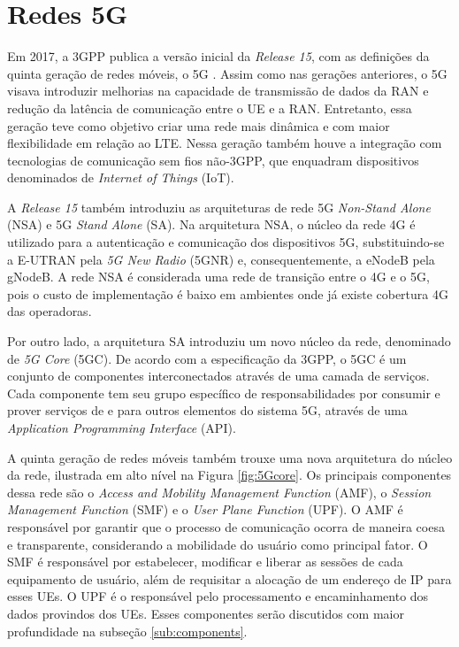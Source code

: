 \section{Redes 5G}

Em 2017, a 3GPP publica a versão inicial da \textit{Release 15}, com as definições da quinta geração de redes móveis, o 5G \cite{3gpp.21.205}.
Assim como nas gerações anteriores, o 5G visava introduzir melhorias na capacidade de transmissão de dados da RAN e redução da latência de comunicação entre o UE e a RAN.
Entretanto, essa geração teve como objetivo criar uma rede mais dinâmica e com maior flexibilidade em relação ao LTE.
Nessa geração também houve a integração com tecnologias de comunicação sem fios não-3GPP, que enquadram dispositivos denominados de \textit{Internet of Things} (IoT).

A \textit{Release 15} também introduziu as arquiteturas de rede 5G \textit{Non-Stand Alone} (NSA) e 5G \textit{Stand Alone} (SA).
Na arquitetura NSA, o núcleo da rede 4G é utilizado para a autenticação e comunicação dos dispositivos 5G, substituindo-se a E-UTRAN pela \textit{5G New Radio} (5GNR) e, consequentemente, a eNodeB pela gNodeB.
A rede NSA é considerada uma rede de transição entre o 4G e o 5G, pois o custo de implementação é baixo em ambientes onde já existe cobertura 4G das operadoras.

Por outro lado, a arquitetura SA introduziu um novo núcleo da rede, denominado de \textit{5G Core} (5GC).
De acordo com a especificação da 3GPP, o 5GC é um conjunto de componentes interconectados através de uma camada de serviços. Cada componente tem seu grupo específico de responsabilidades por consumir e prover serviços de e para outros elementos do sistema 5G, através de uma \textit{Application Programming Interface} (API).

A quinta geração de redes móveis também trouxe uma nova arquitetura do núcleo da rede, ilustrada em alto nível na Figura \ref{fig:5Gcore}. Os principais componentes dessa rede são o \textit{Access and Mobility Management Function} (AMF), o \textit{Session Management Function} (SMF) e o \textit{User Plane Function} (UPF).
O AMF é responsável por garantir que o processo de comunicação ocorra de maneira coesa e transparente, considerando a mobilidade do usuário como principal fator.
O SMF é responsável por estabelecer, modificar e liberar as sessões de cada equipamento de usuário, além de requisitar a alocação de um endereço de IP para esses UEs.
O UPF é o responsável pelo processamento e encaminhamento dos dados provindos dos UEs. Esses componentes serão discutidos com maior profundidade na subseção \ref{sub:components}.

